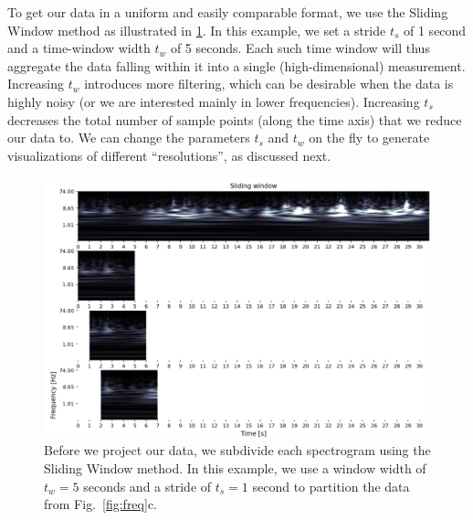 To get our data in a uniform and easily comparable format, we use the Sliding Window method as illustrated in \cref{fig:sliding}. In this example, we set a stride $t_s$ of 1 second and a time-window width $t_w$ of 5 seconds. Each such time window will thus aggregate the data falling within it into a single (high-dimensional) measurement. Increasing $t_w$ introduces more filtering, which can be desirable when the data is highly noisy (or we are interested mainly in lower frequencies). Increasing $t_s$ decreases the total number of sample points (along the time axis) that we reduce our data to.
We can change the parameters $t_s$ and $t_w$ on the fly to generate visualizations of different ``resolutions'', as discussed next.

\begin{figure}[ht]
\centering
\includegraphics[width=\linewidth]{figures/nemo/sliding.png}
\caption{Before we project our data, we subdivide each spectrogram using the Sliding Window method. In this example, we use a window width of $t_w=5$ seconds and a stride of $t_s=1$ second to partition the data from Fig.~\ref{fig:freq}c.}
\label{fig:sliding}
\end{figure}

